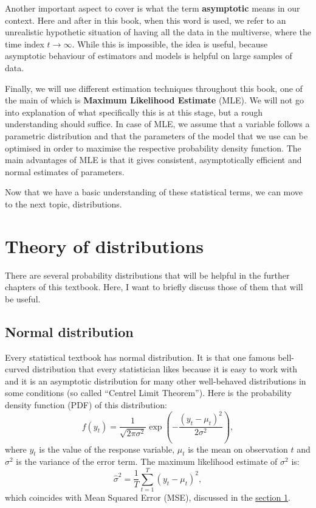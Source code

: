 \documentclass[]{book}
\begin{document}
Another important aspect to cover is what the term \textbf{asymptotic} means in our context. Here and after in this book, when this word is used, we refer to an unrealistic hypothetic situation of having all the data in the multiverse, where the time index \(t \rightarrow \infty\). While this is impossible, the idea is useful, because asymptotic behaviour of estimators and models is helpful on large samples of data.

Finally, we will use different estimation techniques throughout this book, one of the main of which is \textbf{Maximum Likelihood Estimate} (MLE). We will not go into explanation of what specifically this is at this stage, but a rough understanding should suffice. In case of MLE, we assume that a variable follows a parametric distribution and that the parameters of the model that we use can be optimised in order to maximise the respective probability density function. The main advantages of MLE is that it gives consistent, asymptotically efficient and normal estimates of parameters.

Now that we have a basic understanding of these statistical terms, we can move to the next topic, distributions.

\hypertarget{distributions}{%
\section{Theory of distributions}\label{distributions}}

There are several probability distributions that will be helpful in the further chapters of this textbook. Here, I want to briefly discuss those of them that will be useful.

\hypertarget{normal-distribution}{%
\subsection{Normal distribution}\label{normal-distribution}}

Every statistical textbook has normal distribution. It is that one famous bell-curved distribution that every statistician likes because it is easy to work with and it is an asymptotic distribution for many other well-behaved distributions in some conditions (so called ``Centrel Limit Theorem''). Here is the probability density function (PDF) of this distribution:
\begin{equation} \label{eq:Normal}
    f(y_t) = \frac{1}{\sqrt{2 \pi \sigma^2}} \exp \left( -\frac{\left(y_t - \mu_t \right)^2}{2 \sigma^2} \right) ,
\end{equation}
where \(y_t\) is the value of the response variable, \(\mu_t\) is the mean on observation \(t\) and \(\sigma^2\) is the variance of the error term. The maximum likelihood estimate of \(\sigma^2\) is:
\begin{equation} \label{eq:sigmaNormal}
    \hat{\sigma}^2 = \frac{1}{T} \sum_{t=1}^T \left(y_t - \mu_t \right)^2 ,
\end{equation}
which coincides with Mean Squared Error (MSE), discussed in the \protect\hyperlink{errorMeasures}{section 1}.
\end{document}
